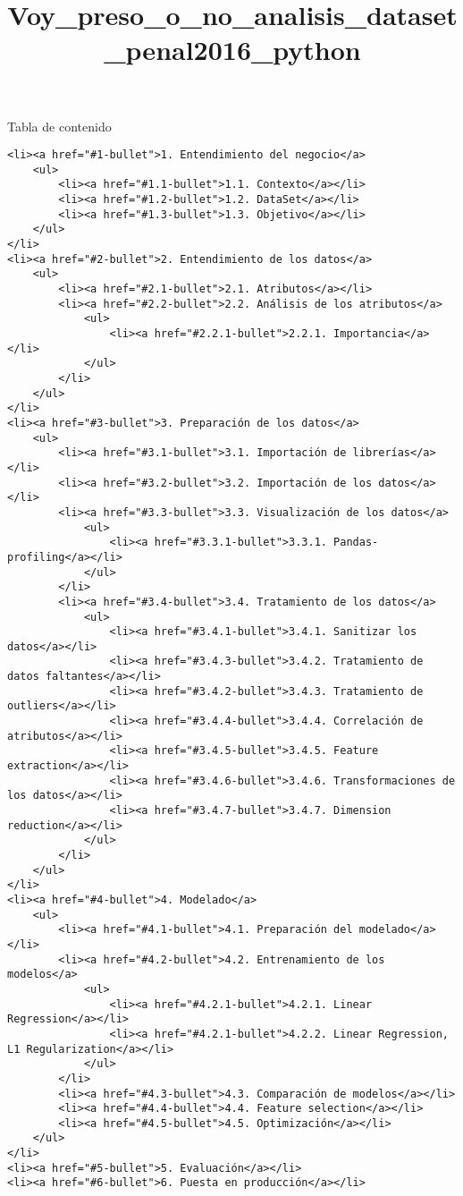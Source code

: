 \documentclass[11pt]{article}
\title{Voy\_preso\_o\_no\_analisis\_dataset\_penal2016\_python}
\begin{document}
    
    
    \maketitle
    
    

    
    \hypertarget{toc_container}{}
Tabla de contenido

\begin{verbatim}
<li><a href="#1-bullet">1. Entendimiento del negocio</a>
    <ul>
        <li><a href="#1.1-bullet">1.1. Contexto</a></li>
        <li><a href="#1.2-bullet">1.2. DataSet</a></li>
        <li><a href="#1.3-bullet">1.3. Objetivo</a></li>
    </ul>
</li>
<li><a href="#2-bullet">2. Entendimiento de los datos</a>
    <ul>
        <li><a href="#2.1-bullet">2.1. Atributos</a></li>
        <li><a href="#2.2-bullet">2.2. Análisis de los atributos</a>
            <ul>
                <li><a href="#2.2.1-bullet">2.2.1. Importancia</a></li>
            </ul>
        </li>
    </ul>
</li>
<li><a href="#3-bullet">3. Preparación de los datos</a>
    <ul>
        <li><a href="#3.1-bullet">3.1. Importación de librerías</a></li>
        <li><a href="#3.2-bullet">3.2. Importación de los datos</a></li>
        <li><a href="#3.3-bullet">3.3. Visualización de los datos</a>
            <ul>
                <li><a href="#3.3.1-bullet">3.3.1. Pandas-profiling</a></li>
            </ul>
        </li>
        <li><a href="#3.4-bullet">3.4. Tratamiento de los datos</a>
            <ul>
                <li><a href="#3.4.1-bullet">3.4.1. Sanitizar los datos</a></li>
                <li><a href="#3.4.3-bullet">3.4.2. Tratamiento de datos faltantes</a></li>
                <li><a href="#3.4.2-bullet">3.4.3. Tratamiento de outliers</a></li>
                <li><a href="#3.4.4-bullet">3.4.4. Correlación de atributos</a></li>
                <li><a href="#3.4.5-bullet">3.4.5. Feature extraction</a></li>
                <li><a href="#3.4.6-bullet">3.4.6. Transformaciones de los datos</a></li>
                <li><a href="#3.4.7-bullet">3.4.7. Dimension reduction</a></li>                    
            </ul>
        </li>
    </ul>
</li>
<li><a href="#4-bullet">4. Modelado</a>
    <ul>
        <li><a href="#4.1-bullet">4.1. Preparación del modelado</a></li>
        <li><a href="#4.2-bullet">4.2. Entrenamiento de los modelos</a>
            <ul>
                <li><a href="#4.2.1-bullet">4.2.1. Linear Regression</a></li>
                <li><a href="#4.2.1-bullet">4.2.2. Linear Regression, L1 Regularization</a></li>
            </ul>
        </li>
        <li><a href="#4.3-bullet">4.3. Comparación de modelos</a></li>
        <li><a href="#4.4-bullet">4.4. Feature selection</a></li>
        <li><a href="#4.5-bullet">4.5. Optimización</a></li>
    </ul>
</li>
<li><a href="#5-bullet">5. Evaluación</a></li>
<li><a href="#6-bullet">6. Puesta en producción</a></li>
\end{verbatim}
\end{document}
